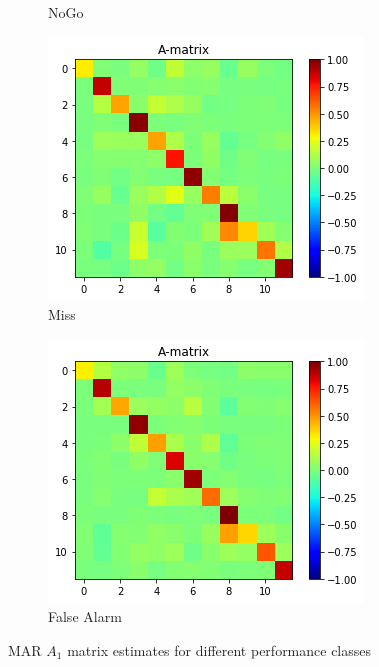 \documentclass[a4paper,10pt]{article}
\begin{document}
\begin{figure}
\begin{subfigure}[b]{0.4\textwidth}
        \caption{NoGo}
        \label{fig:marN_analytic_withinput_A1_Nogo}
    \end{subfigure}
    \begin{subfigure}[b]{0.4\textwidth}
        \includegraphics[width=\textwidth]{img/marN_analytic_withinput_A1_Miss.png}
        \caption{Miss}
        \label{fig:marN_analytic_withinput_A1_Miss}
    \end{subfigure}\hspace{0.05\textwidth}
    \begin{subfigure}[b]{0.4\textwidth}
        \includegraphics[width=\textwidth]{img/marN_analytic_withinput_A1_FA.png}
        \caption{False Alarm}
        \label{fig:marN_analytic_withinput_A1_FA}
    \end{subfigure}
    \caption{MAR $A_1$ matrix estimates for different performance classes}
    \label{fig:marN_analytic_withinput_A1_ByPerformance}
\end{figure}
\end{document}
